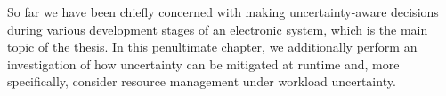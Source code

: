 So far we have been chiefly concerned with making uncertainty-aware decisions
during various development stages of an electronic system, which is the main
topic of the thesis. In this penultimate chapter, we additionally perform an
investigation of how uncertainty can be mitigated at runtime and, more
specifically, consider resource management under workload uncertainty.

\section{\introductiontitle}

\section{\problemtitle}

\section{\priortitle}

\section{\solutiontitle}

\section{\resultstitle}

\section{\conclusiontitle}
